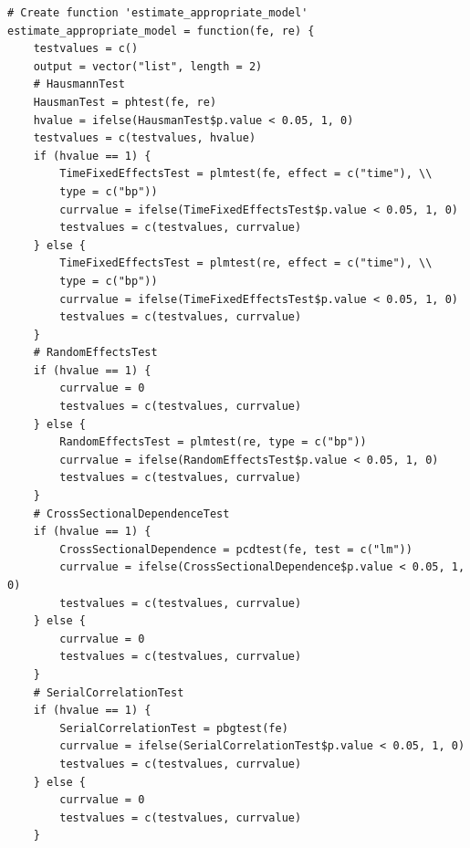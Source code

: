 \documentclass[a4paper]{article}
\begin{document}
{\begin{lstlisting}
# Create function 'estimate_appropriate_model'
estimate_appropriate_model = function(fe, re) {
    testvalues = c()
    output = vector("list", length = 2)
    # HausmannTest
    HausmanTest = phtest(fe, re)
    hvalue = ifelse(HausmanTest$p.value < 0.05, 1, 0)
    testvalues = c(testvalues, hvalue)
    if (hvalue == 1) {
        TimeFixedEffectsTest = plmtest(fe, effect = c("time"), \\
		type = c("bp"))
        currvalue = ifelse(TimeFixedEffectsTest$p.value < 0.05, 1, 0)
        testvalues = c(testvalues, currvalue)
    } else {
        TimeFixedEffectsTest = plmtest(re, effect = c("time"), \\
		type = c("bp"))
        currvalue = ifelse(TimeFixedEffectsTest$p.value < 0.05, 1, 0)
        testvalues = c(testvalues, currvalue)
    }
    # RandomEffectsTest
    if (hvalue == 1) {
        currvalue = 0
        testvalues = c(testvalues, currvalue)
    } else {
        RandomEffectsTest = plmtest(re, type = c("bp"))
        currvalue = ifelse(RandomEffectsTest$p.value < 0.05, 1, 0)
        testvalues = c(testvalues, currvalue)
    }
    # CrossSectionalDependenceTest
    if (hvalue == 1) {
        CrossSectionalDependence = pcdtest(fe, test = c("lm"))
        currvalue = ifelse(CrossSectionalDependence$p.value < 0.05, 1, 0)
        testvalues = c(testvalues, currvalue)
    } else {
        currvalue = 0
        testvalues = c(testvalues, currvalue)
    }
    # SerialCorrelationTest
    if (hvalue == 1) {
        SerialCorrelationTest = pbgtest(fe)
        currvalue = ifelse(SerialCorrelationTest$p.value < 0.05, 1, 0)
        testvalues = c(testvalues, currvalue)
    } else {
        currvalue = 0
        testvalues = c(testvalues, currvalue)
    }
    

\end{lstlisting}}
\end{document}
